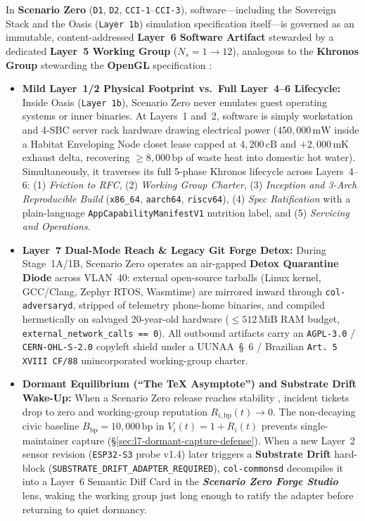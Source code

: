 In \textbf{Scenario Zero} (\texttt{D1}, \texttt{D2}, \texttt{CCI-1}--\texttt{CCI-3}), software---including the Sovereign Stack and the Oasis (\texttt{Layer~1b}) simulation specification itself---is governed as an immutable, content-addressed \textbf{Layer~6 Software Artifact} stewarded by a dedicated \textbf{Layer~5 Working Group} ($N_s = 1 \to 12$), analogous to the \textbf{Khronos Group} stewarding the \textbf{OpenGL} specification \parencite{khronos_opengl}:
\begin{itemize}
    \item \textbf{Mild Layer~1/2 Physical Footprint vs.\ Full Layer~4--6 Lifecycle:} Inside Oasis (\texttt{Layer~1b}), Scenario Zero never emulates guest operating systems or inner binaries. At Layers~1 and~2, software is simply workstation and 4-SBC server rack hardware drawing electrical power ($450{,}000\,\mathrm{mW}$ inside a Habitat Enveloping Node closet lease capped at $4{,}200\,\mathrm{cB}$ and $+2{,}000\,\mathrm{mK}$ exhaust delta, recovering $\ge 8{,}000\,\mathrm{bp}$ of waste heat into domestic hot water). Simultaneously, it traverses its full 5-phase Khronos lifecycle across Layers~4--6: (1) \textit{Friction to RFC}, (2) \textit{Working Group Charter}, (3) \textit{Inception and 3-Arch Reproducible Build} (\texttt{x86\_64}, \texttt{aarch64}, \texttt{riscv64}), (4) \textit{Spec Ratification} with a plain-language \texttt{AppCapabilityManifestV1} nutrition label, and (5) \textit{Servicing and Operations}.
    \item \textbf{Layer~7 Dual-Mode Reach \& Legacy Git Forge Detox:} During Stage~1A/1B, Scenario Zero operates an air-gapped \textbf{Detox Quarantine Diode} across VLAN~40: external open-source tarballs (Linux kernel, GCC/Clang, Zephyr RTOS, Wasmtime) are mirrored inward through \texttt{col-adversaryd}, stripped of telemetry phone-home binaries, and compiled hermetically on salvaged 20-year-old hardware ($\le 512\,\mathrm{MiB}$ RAM budget, \texttt{external\_network\_calls == 0}). All outbound artifacts carry an \texttt{AGPL-3.0} / \texttt{CERN-OHL-S-2.0} copyleft shield under a UUNAA~\S~6 / Brazilian \texttt{Art.~5{\textordmasculine} XVIII CF/88} unincorporated working-group charter.
    \item \textbf{Dormant Equilibrium (``The \TeX{} Asymptote'') and Substrate Drift Wake-Up:} When a Scenario Zero release reaches stability \parencite{knuth1984tex}, incident tickets drop to zero and working-group reputation $R_{i,\mathrm{bp}}(t) \to 0$. The non-decaying civic baseline $B_{\mathrm{bp}} = 10{,}000\,\mathrm{bp}$ in $V_i(t) = 1 + R_i(t)$ prevents single-maintainer capture (\S\ref{sec:l7-dormant-capture-defense}). When a new Layer~2 sensor revision (\texttt{ESP32-S3} probe v1.4) later triggers a \textbf{Substrate Drift} hard-block (\texttt{SUBSTRATE\_DRIFT\_ADAPTER\_REQUIRED}), \texttt{col-commonsd} decompiles it into a Layer~6 Semantic Diff Card in the \textbf{\textit{Scenario Zero Forge Studio}} lens, waking the working group just long enough to ratify the adapter before returning to quiet dormancy.
\end{itemize}

